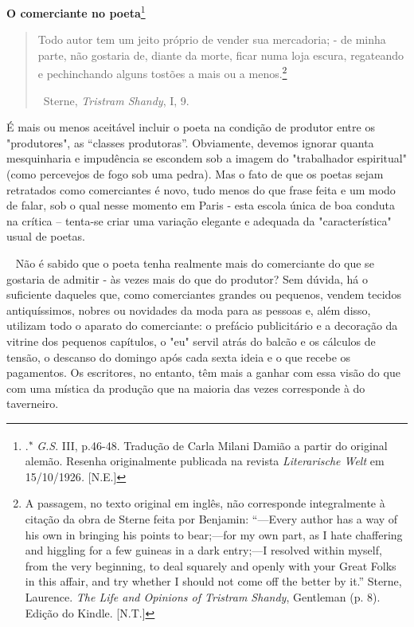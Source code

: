 \textbf{O comerciante no poeta}\footnote{.\textsuperscript{∗}
  \emph{G.S}. III, p.46-48. Tradução de Carla Milani Damião a partir do
  original alemão. Resenha originalmente publicada na revista
  \emph{Literarische Welt} em 15/10/1926\emph{.} {[}N.E.{]}}

\begin{quote}
Todo autor tem um jeito próprio de vender sua mercadoria; - de minha
parte, não gostaria de, diante da morte, ficar numa loja escura,
regateando e pechinchando alguns tostões a mais ou a menos.\footnote{A
  passagem, no texto original em inglês, não corresponde integralmente à
  citação da obra de Sterne feita por Benjamin: ``---Every author has a
  way of his own in bringing his points to bear;---for my own part, as I
  hate chaffering and higgling for a few guineas in a dark entry;---I
  resolved within myself, from the very beginning, to deal squarely and
  openly with your Great Folks in this affair, and try whether I should
  not come off the better by it.'' Sterne, Laurence. \emph{The Life and
  Opinions of Tristram Shandy}, Gentleman (p. 8). Edição do Kindle.
  {[}N.T.{]}}

~Sterne, \emph{Tristram Shandy}, I, 9.
\end{quote}

É mais ou menos aceitável incluir o poeta na condição de produtor entre
os "produtores", as ``classes produtoras''. Obviamente, devemos ignorar
quanta mesquinharia e impudência se escondem sob a imagem do
"trabalhador espiritual" (como percevejos de fogo sob uma pedra). Mas o
fato de que os poetas sejam retratados como comerciantes é novo, tudo
menos do que frase feita e um modo de falar, sob o qual nesse momento em
Paris - esta escola única de boa conduta na crítica -- tenta-se criar
uma variação elegante e adequada da "característica" usual de poetas.

~ Não é sabido que o poeta tenha realmente mais do comerciante do que se
gostaria de admitir - às vezes mais do que do produtor? Sem dúvida, há o
suficiente daqueles que, como comerciantes grandes ou pequenos, vendem
tecidos antiquíssimos, nobres ou novidades da moda para as pessoas e,
além disso, utilizam todo o aparato do comerciante: o prefácio
publicitário e a decoração da vitrine dos pequenos capítulos, o "eu"
servil atrás do balcão e os cálculos de tensão, o descanso do domingo
após cada sexta ideia e o que recebe os pagamentos. Os escritores, no
entanto, têm mais a ganhar com essa visão do que com uma mística da
produção que na maioria das vezes corresponde à do taverneiro.

